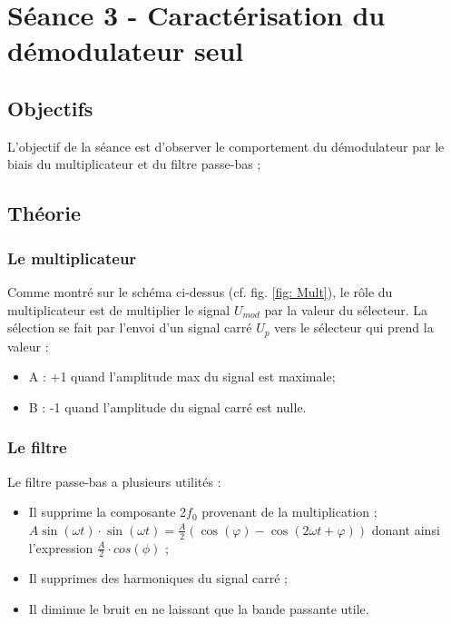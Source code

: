 

\section{Séance 3 - Caractérisation du démodulateur seul}

\subsection{Objectifs}

    L'objectif de la séance est d'observer le comportement du démodulateur par le biais du
    multiplicateur et du filtre passe-bas ;

  

\subsection{Théorie}

\subsubsection{Le multiplicateur}


Comme montré sur le schéma ci-dessus (cf. fig. \ref{fig: Mult}), le rôle du multiplicateur
est de multiplier le signal $U_{mod}$ par la valeur du sélecteur. La sélection se fait par l'envoi
d'un signal carré $U_p$ vers le sélecteur qui prend la valeur :

\begin{itemize}
    \item A : +1 quand l'amplitude max du signal est maximale;
    \item B : -1 quand l'amplitude du signal carré est nulle. 
\end{itemize}

\subsubsection{Le filtre} \label{filtre}

Le filtre passe-bas a plusieurs utilités :

\begin{itemize}
    \item Il supprime la composante 2$f_0$ provenant de la multiplication ;\\
   $ A \sin(\omega t) \cdot \sin(\omega t) = \frac{A}{2} \left( \cos(\varphi) - \cos(2\omega t + \varphi) \right)$
   donant ainsi l'expression $\frac{A}{2} \cdot cos(\phi)$ ;
    \item Il supprimes des harmoniques du signal carré ;
    \item Il diminue le bruit en ne laissant que la bande passante utile.
    
\end{itemize}



